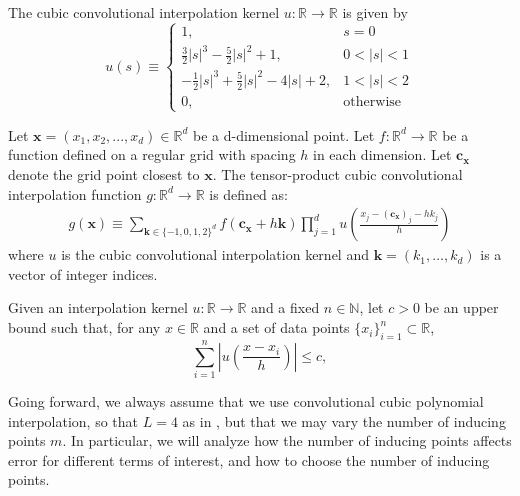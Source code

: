 \begin{definition}\label{def:cubic-interpolation-kernel}

The cubic convolutional interpolation kernel $u:\mathbb{R}\rightarrow\mathbb{R}$ is given by
$$
u(s)\equiv\begin{cases}
1, & s=0\\
\frac{3}{2}\vert s\vert^3-\frac{5}{2}\vert s\vert^2+1, & 0<\vert s\vert <1\\
-\frac{1}{2}\vert s\vert^3+\frac{5}{2}\vert s\vert^2-4\vert s\vert+2, & 1<\vert s\vert<2\\
0, & \text{otherwise}
\end{cases}
$$
\end{definition}

\begin{definition}\label{def:tensor-product-cubic-interpolation-alt1}
Let $\mathbf{x} = (x_1, x_2, ..., x_d) \in \mathbb{R}^d$ be a d-dimensional point. Let $f:\mathbb{R}^d \rightarrow \mathbb{R}$ be a function defined on a regular grid with spacing $h$ in each dimension. Let $\mathbf{c_x}$ denote the grid point closest to $\mathbf{x}$.  The tensor-product cubic convolutional interpolation function $g:\mathbb{R}^d\rightarrow \mathbb{R}$ is defined as:
{\footnotesize
\begin{align*}
    g(\mathbf{x}) \equiv \sum_{\mathbf{k} \in \{-1, 0, 1, 2\}^d} f(\mathbf{c_x} + h\mathbf{k}) \prod_{j=1}^d u\left(\frac{x_j - (\mathbf{c_x})_j - h k_j}{h}\right)
\end{align*}
}
where $u$ is the cubic convolutional interpolation kernel and $\mathbf{k} = (k_1, \ldots, k_d)$ is a vector of integer indices.
\end{definition}

\begin{definition}\label{def:sum-weight-upper-bound}
    Given an interpolation kernel $u:\mathbb{R}\rightarrow\mathbb{R}$ and a fixed $n\in \mathbb{N}$, let $c>0$ be an upper bound such that, for any $x\in  \mathbb{R}$ and a set of data points $\{x_i\}_{i=1}^n \subset \mathbb{R}$,
$$
\sum_{i=1}^n \left\vert u\left(\frac{x - x_i}{h}\right) \right\vert\leq c,
$$
\end{definition}

Going forward, we always assume that we use convolutional cubic polynomial interpolation, so that $L=4$ as in \cite{wilson2015kernel}, but that we may vary the number of inducing points $m$. In particular, we will analyze how the number of inducing points affects error for different terms of interest, and how to choose the number of inducing points.
